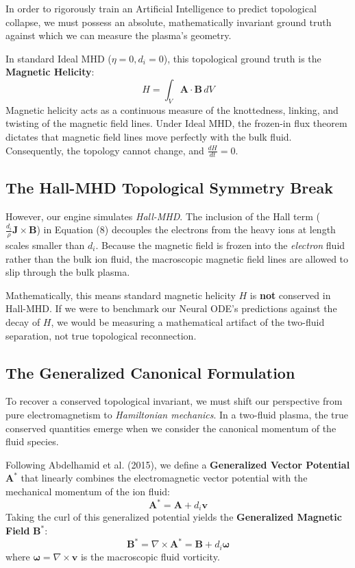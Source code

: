 \documentclass[11pt, a4paper]{article}
\begin{document}
In order to rigorously train an Artificial Intelligence to predict topological collapse, we must possess an absolute, mathematically invariant ground truth against which we can measure the plasma's geometry. 

In standard Ideal MHD ($\eta = 0, d_i = 0$), this topological ground truth is the \textbf{Magnetic Helicity}:
\begin{equation}
    H = \int_V \mathbf{A} \cdot \mathbf{B} \, dV
\end{equation}
Magnetic helicity acts as a continuous measure of the knottedness, linking, and twisting of the magnetic field lines. Under Ideal MHD, the frozen-in flux theorem dictates that magnetic field lines move perfectly with the bulk fluid. Consequently, the topology cannot change, and $\frac{dH}{dt} = 0$. 

\subsection{The Hall-MHD Topological Symmetry Break}
However, our engine simulates \textit{Hall-MHD}. The inclusion of the Hall term ($\frac{d_i}{\rho} \mathbf{J} \times \mathbf{B}$) in Equation (8) decouples the electrons from the heavy ions at length scales smaller than $d_i$. Because the magnetic field is frozen into the \textit{electron} fluid rather than the bulk ion fluid, the macroscopic magnetic field lines are allowed to slip through the bulk plasma. 

Mathematically, this means standard magnetic helicity $H$ is \textbf{not} conserved in Hall-MHD. If we were to benchmark our Neural ODE's predictions against the decay of $H$, we would be measuring a mathematical artifact of the two-fluid separation, not true topological reconnection. 

\subsection{The Generalized Canonical Formulation}
To recover a conserved topological invariant, we must shift our perspective from pure electromagnetism to \textit{Hamiltonian mechanics}. In a two-fluid plasma, the true conserved quantities emerge when we consider the canonical momentum of the fluid species. 

Following Abdelhamid et al. (2015), we define a \textbf{Generalized Vector Potential} $\mathbf{A}^*$ that linearly combines the electromagnetic vector potential with the mechanical momentum of the ion fluid:
\begin{equation}
    \mathbf{A}^* = \mathbf{A} + d_i \mathbf{v}
\end{equation}
Taking the curl of this generalized potential yields the \textbf{Generalized Magnetic Field} $\mathbf{B}^*$:
\begin{equation}
    \mathbf{B}^* = \nabla \times \mathbf{A}^* = \mathbf{B} + d_i \boldsymbol{\omega}
\end{equation}
where $\boldsymbol{\omega} = \nabla \times \mathbf{v}$ is the macroscopic fluid vorticity. 
\end{document}
